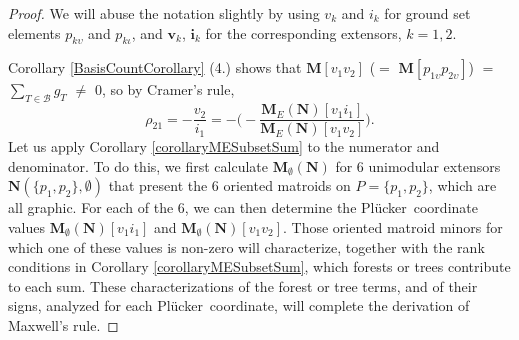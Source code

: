 \documentclass[12pt]{article}
\theoremstyle{definition}
\newcommand{\Is}{\ensuremath{\iota}}
\newcommand{\Vs}{\ensuremath{\upsilon}}
\newcommand{\ext}[1]{\ensuremath{\mathbf{#1}}}
\newcommand{\Plucker}{Pl\"{u}cker\ }
\begin{document}
\begin{proof}
We will abuse the notation slightly by using $v_k$ and $i_k$ for
ground set elements $p_{k\Vs}$ and $p_{k\Is}$, and $\ext{v}_k$,
$\ext{i}_k$ for the corresponding extensors, $k=1,2$.

Corollary \ref{BasisCountCorollary} (4.) shows that 
$\ext{M}[v_1v_2]$ ($=$ 
$\ext{M}[p_{1\Vs}p_{2\Vs}]$) $=$ 
$\sum_{T\in \mathcal{B}}g_T$ $\neq$ $0$, so by Cramer's rule,
\[
\rho_{21}=
-\frac{v_2}{i_1}=-\Big(-\frac{\ext{M}_E(\ext{N})[v_1i_1]}{\ext{M}_E(\ext{N})[v_1v_2]}\Big).
\]
Let us apply Corollary \ref{corollaryMESubsetSum} to the numerator and 
denominator.  To do this, we first calculate 
$\ext{M}_{\emptyset}(\ext{N})$ for 6 unimodular extensors
$\ext{N}(\{p_1,p_2\},\emptyset)$ that present the 6 oriented matroids
on $P=\{p_1,p_2\}$, which are all graphic.  For each of the 6,
we can then determine
the \Plucker coordinate 
values $\ext{M}_{\emptyset}(\ext{N})[v_1i_1]$
and $\ext{M}_{\emptyset}(\ext{N})[v_1v_2]$.  Those oriented matroid
minors for which one of these values is non-zero
will characterize, together with the rank conditions in
Corollary \ref{corollaryMESubsetSum}, which forests or trees contribute to
each sum.  These characterizations of the forest or tree terms, and
of their signs, analyzed for each
\Plucker coordinate, will complete the derivation of Maxwell's rule.

\def\omN{\mathcal{N}}


\end{proof}
\end{document}
